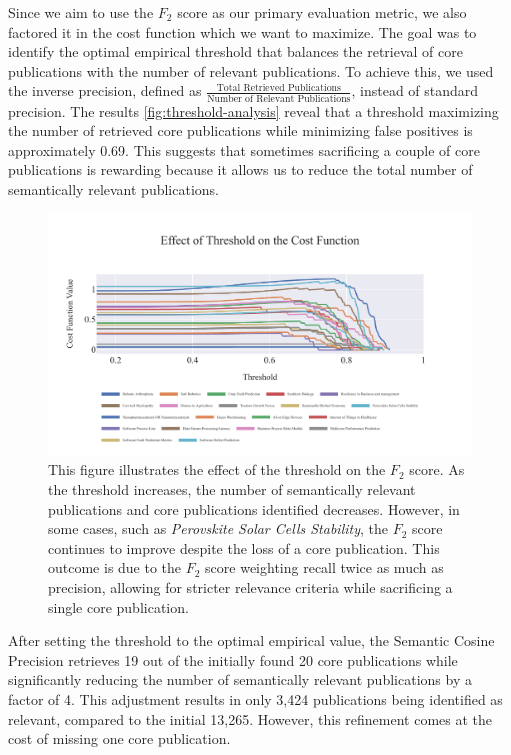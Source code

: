 Since we aim to use the $F_2$ score as our primary evaluation metric, we also factored it in the cost function which we want to maximize. The goal was to identify the optimal empirical threshold that balances the retrieval of core publications with the number of relevant publications. To achieve this, we used the inverse precision, defined as {\scriptsize$\frac{\text{Total Retrieved Publications}}{\text{Number of Relevant Publications}}$}, instead of standard precision. The results \autoref{fig:threshold-analysis} reveal that a threshold maximizing the number of retrieved core publications while minimizing false positives is approximately 0.69. This suggests that sometimes sacrificing a couple of core publications is rewarding because it allows us to reduce the total number of semantically relevant publications.

\begin{figure}
	\centering	
	\includegraphics[scale=0.7]{pics/threshold-analysis.pdf}
	\caption[Semantic Cosine Threshold: Empirical Analysis]{This figure illustrates the effect of the threshold on the $F_2$ score. As the threshold increases, the number of semantically relevant publications and core publications identified decreases. However, in some cases, such as \textit{Perovskite Solar Cells Stability}, the $F_2$ score continues to improve despite the loss of a core publication. This outcome is due to the $F_2$ score weighting recall twice as much as precision, allowing for stricter relevance criteria while sacrificing a single core publication.}\label{fig:threshold-analysis}
\end{figure}

After setting the threshold to the optimal empirical value, the Semantic Cosine Precision retrieves 19 out of the initially found 20 core publications while significantly reducing the number of semantically relevant publications by a factor of 4. This adjustment results in only 3,424 publications being identified as relevant, compared to the initial 13,265. However, this refinement comes at the cost of missing one core publication.


